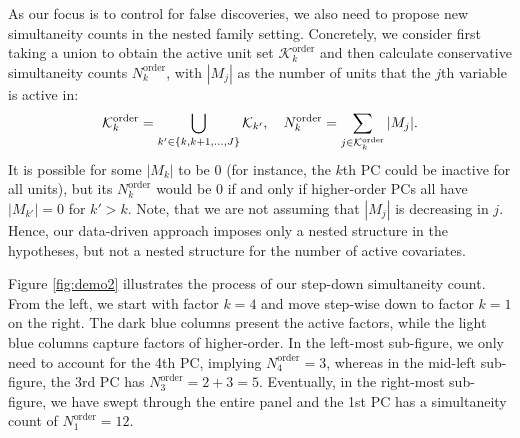 \documentclass[11pt]{article}
\newcommand{\q}{\text{\quad}}
\begin{document}
	As our focus is to control for false discoveries, we also need to propose new simultaneity counts in the nested family setting. Concretely, we consider first taking a union to obtain the active unit set ${\mathcal{K}}_k^{\text{order}}$ and then calculate conservative simultaneity counts $N^{\text{order}}_k$, with $|M_j|$ as the number of units that the $j$th variable is active in:
	\begin{equation}
		{\mathcal{K}}^{\text{order}}_k=
		\bigcup_{k'\in\{k,k+1,...,J\}} \mathcal{K}_{k'},\q
		{N}_k^{\text{order}}=\sum_{j\in {\mathcal{K}}_k^{\text{order}}}|M_j| .
	\end{equation}
	It is possible for some $|M_k|$ to be 0 (for instance, the $k$th PC could be inactive for all units), but its ${N}_k^{\text{order}}$ would be 0 if and only if higher-order PCs all have $|M_{k'}|=0$ for $k'>k$. Note, that we are not assuming that $|M_j|$ is decreasing in $j$. Hence, our data-driven approach imposes only a nested structure in the hypotheses, but not a nested structure for the number of active covariates.
	
	
	Figure \ref{fig:demo2} illustrates the process of our step-down simultaneity count. From the left, we start with factor $k=4$ and move step-wise down to factor $k=1$ on the right. The dark blue columns present the active factors, while the light blue columns capture factors of higher-order. %
	In the left-most sub-figure, we only need to account for the 4th PC, implying ${N}_4^{\text{order}}=3$, whereas in the mid-left sub-figure, the 3rd PC has ${N}_3^{\text{order}}=2+3=5$. Eventually, in the right-most sub-figure, we have swept through the entire panel and the 1st PC has a simultaneity count of ${N}_1^{\text{order}}=12$.
	
\end{document}
